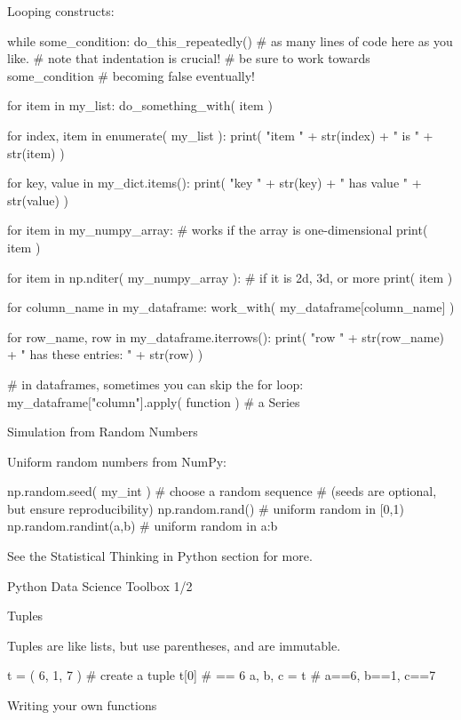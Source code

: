 \documentclass[a4paper,landscape,columns=3]{cheatsheet}
\def\chap#1{\vspace{5mm}\begin{tcolorbox}[colback=red!5!white,colframe=red!75!black,leftrule=3mm]
    \Large #1
\end{tcolorbox}}
\def\sect#1{\begin{tcolorbox}[colback=blue!5!white,colframe=blue!75!black,size=title,leftrule=2mm]
    \large #1
\end{tcolorbox}}
\begin{document}
Looping constructs:
\begin{python}
while some_condition:
    do_this_repeatedly()
    # as many lines of code here as you like.
    # note that indentation is crucial!
    # be sure to work towards some_condition
    # becoming false eventually!

for item in my_list:
    do_something_with( item )

for index, item in enumerate( my_list ):
    print( "item " + str(index) +
           " is " + str(item) )

for key, value in my_dict.items():
    print( "key " + str(key) +
           " has value " + str(value) )

for item in my_numpy_array:
    # works if the array is one-dimensional
    print( item )

for item in np.nditer( my_numpy_array ):
    # if it is 2d, 3d, or more
    print( item )

for column_name in my_dataframe:
    work_with( my_dataframe[column_name] )

for row_name, row in my_dataframe.iterrows():
    print( "row " + str(row_name) +
           " has these entries: " + str(row) )

# in dataframes, sometimes you can skip the for loop:
my_dataframe["column"].apply( function )  # a Series
\end{python}

\sect{Simulation from Random Numbers}

Uniform random numbers from NumPy:
\begin{python}
np.random.seed( my_int )  # choose a random sequence
# (seeds are optional, but ensure reproducibility)
np.random.rand()          # uniform random in [0,1)
np.random.randint(a,b)    # uniform random in a:b
\end{python}

See the Statistical Thinking in Python section for more.

\chap{Python Data Science Toolbox 1/2}

\sect{Tuples}

Tuples are like lists, but use parentheses, and are immutable.

\begin{python}
t = ( 6, 1, 7 )        # create a tuple
t[0]                   # == 6
a, b, c = t            # a==6, b==1, c==7
\end{python}

\sect{Writing your own functions}
\end{document}
